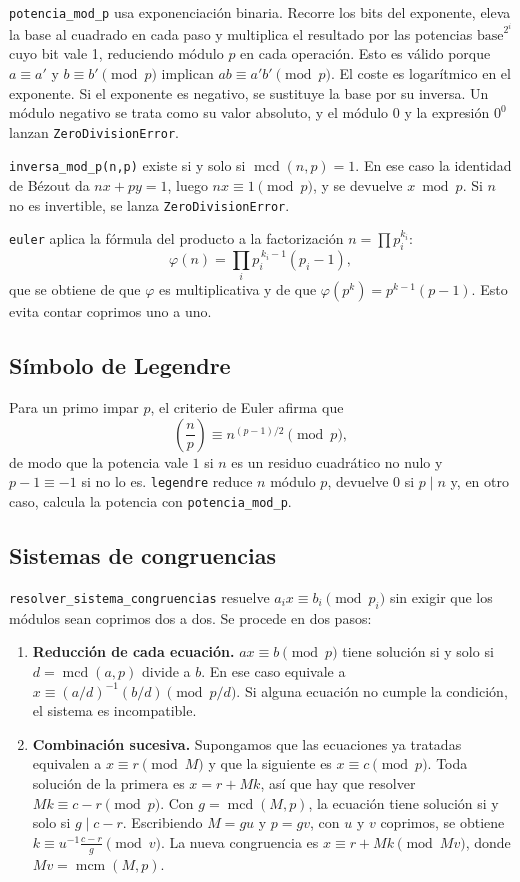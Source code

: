 \documentclass[11pt,a4paper]{article}
\newcommand{\code}[1]{\texttt{#1}}
\begin{document}
\code{potencia\_mod\_p} usa exponenciación binaria. Recorre los bits del exponente, eleva la base al cuadrado en cada paso y multiplica el resultado por las potencias $\text{base}^{2^i}$ cuyo bit vale 1, reduciendo módulo $p$ en cada operación. Esto es válido porque $a\equiv a'$ y $b\equiv b' \pmod p$ implican $ab\equiv a'b' \pmod p$. El coste es logarítmico en el exponente. Si el exponente es negativo, se sustituye la base por su inversa. Un módulo negativo se trata como su valor absoluto, y el módulo 0 y la expresión $0^0$ lanzan \code{ZeroDivisionError}.

\code{inversa\_mod\_p(n,p)} existe si y solo si $\operatorname{mcd}(n,p)=1$. En ese caso la identidad de Bézout da $nx+py=1$, luego $nx\equiv1 \pmod p$, y se devuelve $x \bmod p$. Si $n$ no es invertible, se lanza \code{ZeroDivisionError}.

\code{euler} aplica la fórmula del producto a la factorización $n=\prod p_i^{k_i}$:
\[
\varphi(n)=\prod_i p_i^{\,k_i-1}(p_i-1),
\]
que se obtiene de que $\varphi$ es multiplicativa y de que $\varphi(p^k)=p^{k-1}(p-1)$. Esto evita contar coprimos uno a uno.

\subsection{Símbolo de Legendre}

Para un primo impar $p$, el criterio de Euler afirma que
\[
\left(\frac{n}{p}\right)\equiv n^{(p-1)/2} \pmod p,
\]
de modo que la potencia vale $1$ si $n$ es un residuo cuadrático no nulo y $p-1\equiv-1$ si no lo es. \code{legendre} reduce $n$ módulo $p$, devuelve 0 si $p\mid n$ y, en otro caso, calcula la potencia con \code{potencia\_mod\_p}.

\subsection{Sistemas de congruencias}

\code{resolver\_sistema\_congruencias} resuelve $a_i x\equiv b_i \pmod{p_i}$ sin exigir que los módulos sean coprimos dos a dos. Se procede en dos pasos:

\begin{enumerate}
\item \textbf{Reducción de cada ecuación.} $a x\equiv b \pmod p$ tiene solución si y solo si $d=\operatorname{mcd}(a,p)$ divide a $b$. En ese caso equivale a $x\equiv (a/d)^{-1}(b/d) \pmod{p/d}$. Si alguna ecuación no cumple la condición, el sistema es incompatible.
\item \textbf{Combinación sucesiva.} Supongamos que las ecuaciones ya tratadas equivalen a $x\equiv r \pmod M$ y que la siguiente es $x\equiv c \pmod p$. Toda solución de la primera es $x=r+Mk$, así que hay que resolver $Mk\equiv c-r \pmod p$. Con $g=\operatorname{mcd}(M,p)$, la ecuación tiene solución si y solo si $g\mid c-r$. Escribiendo $M=gu$ y $p=gv$, con $u$ y $v$ coprimos, se obtiene $k\equiv u^{-1}\frac{c-r}{g} \pmod v$. La nueva congruencia es $x\equiv r+Mk \pmod{Mv}$, donde $Mv=\operatorname{mcm}(M,p)$.
\end{enumerate}
\end{document}
